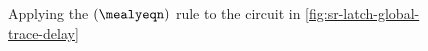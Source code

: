 \begin{figure}
    \centering
    \caption{
        Applying the \((\mealyeqn)\) rule to the circuit in
        \cref{fig:sr-latch-global-trace-delay}
    }
    \label{fig:sr-latch-pre-mealy}
\end{figure}